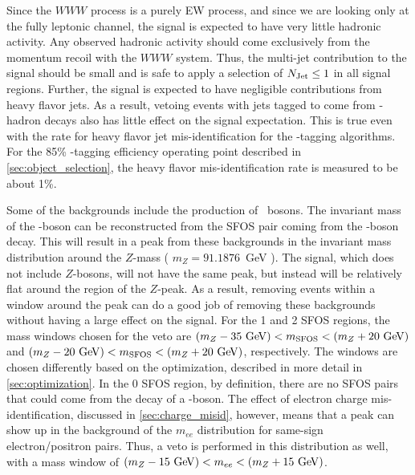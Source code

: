 




Since the $WWW$ process is a purely EW process, and since
we are looking only at the fully leptonic channel, the 
signal is expected to have very little hadronic 
activity. Any observed hadronic activity should come exclusively
from the momentum recoil with the $WWW$ system.
Thus, the multi-jet contribution to the signal
should be small and is safe to apply a selection of $N_{\textrm{Jet}} \leq 1$
in all signal regions.
Further, the signal is 
expected to have negligible contributions
from heavy flavor jets. As a result, vetoing events with jets
tagged to come from \bee-hadron decays also has
little effect on the signal expectation. This is true even with 
the rate for heavy flavor jet mis-identification for the 
\bee-tagging algorithms. For the 
85\% \bee-tagging efficiency operating point described in 
\sec\ref{sec:object_selection}, the heavy flavor
mis-identification rate is measured to be about 1\%. %


Some of the backgrounds include the production of \z~bosons.
The invariant mass of the \z-boson can be reconstructed from the SFOS
pair coming from the \z-boson decay. 
This will result in a peak from these backgrounds
in the invariant mass distribution around 
the $Z$-mass ( $m_{Z}=91.1876$~GeV \cite{PDG:2014}).
The signal, which does not include $Z$-bosons, 
will not have the same peak, but instead
will be relatively flat around the region of the $Z$-peak. 
As a result, removing events within a window around the peak can do a good job
of removing these backgrounds without having a large effect on the signal.
For the 1 and 2 SFOS regions, the mass windows
chosen for the veto are $(m_Z-35\GeV )< m_{\textrm{SFOS}} < (m_Z+20\GeV)$
and $(m_Z-20\GeV )< m_{\textrm{SFOS}} < (m_Z+20\GeV)$, respectively.
The windows are chosen differently based on 
the optimization, described in more detail in \sec\ref{sec:optimization}.
In the 0 SFOS region, by definition, there are no SFOS pairs that could come 
from the decay of a \z-boson. 
The effect of electron charge mis-identification,
discussed in \sec\ref{sec:charge_misid}, however, means that a 
peak can show up in the background
of the $m_{ee}$ distribution for same-sign electron/positron pairs. 
Thus, a veto is performed in this distribution as well, with 
a mass window of $(m_Z-15\GeV) < m_{ee} < (m_Z+15\GeV)$.


